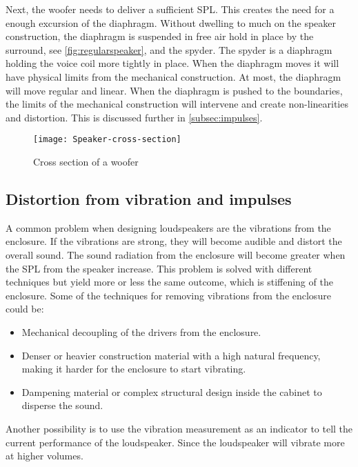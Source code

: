 Next, the woofer needs to deliver a sufficient \gls{SPL}. This creates the need for a enough excursion of the diaphragm. Without dwelling to much on the speaker construction, the diaphragm is suspended in free air hold in place by the surround, see \autoref{fig:regularspeaker}, and the spyder. The spyder is a diaphragm holding the voice coil more tightly in place. When the diaphragm moves it will have physical limits from the mechanical construction. At most, the diaphragm will move regular and linear. When the diaphragm is pushed to the boundaries, the limits of the mechanical construction will intervene and create non-linearities and distortion. This is discussed further in \autoref{subsec:impulses}.

\begin{figure}
\centering
\texttt{[image: Speaker-cross-section]}
\caption{Cross section of a woofer}
\label{fig:louderspeakerCrossSection}
\end{figure}



\subsection{Distortion from vibration and impulses}\label{subsec:impulses}

A common problem when designing loudspeakers are the vibrations from the enclosure. If the vibrations are strong, they will become audible and distort the overall sound. The sound radiation from the enclosure will become greater when the \gls{SPL} from the speaker increase. This problem is solved with different techniques but yield more or less the same outcome, which is stiffening of the enclosure. Some of the techniques for removing vibrations from the enclosure could be:
\begin{itemize}
\item Mechanical decoupling of the drivers from the enclosure.
\item Denser or heavier construction material with a high natural frequency, making it harder for the enclosure to start vibrating.
\item Dampening material or complex structural design inside the cabinet to disperse the sound.
\end{itemize}

Another possibility is to use the vibration measurement as an indicator to tell the current performance of the loudspeaker. Since the loudspeaker will vibrate more at higher volumes. %


